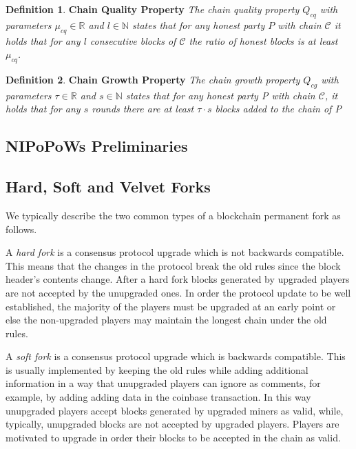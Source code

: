 \documentclass[10pt,a4paper]{article}
\theoremstyle{plain}
\theoremstyle{definition}
\newtheorem{defn}{Definition}
\theoremstyle{lemma}
\begin{document}
\begin{defn}{\textbf{Chain Quality Property}}
	\textit{The chain quality property $Q_{cq}$ with parameters $\mu_{cq} \in \mathbb{R}$ and $l \in \mathbb{N}$ states that for any honest party $P$ with chain $\mathcal{C}$ it holds that for any $l $ consecutive blocks of $\mathcal{C}$ the ratio of honest blocks is at least $\mu_{cq}$.}
	\label{defn:chain_quality}
\end{defn}

\begin{defn}{\textbf{Chain Growth Property}}
	\textit{The chain growth property $Q_{cg}$ with
parameters $\tau \in \mathbb{R}$ and $s \in \mathbb{N}$ states that for any honest party
\textit{P} with chain $\mathcal{C}$, it holds that for any $s$ rounds there are at least 
$\tau \cdot s$ blocks added to the chain of \textit{P}}
	\label{defn:chain_growth}
\end{defn}

\subsection{NIPoPoWs Preliminaries}

\subsection{Hard, Soft and Velvet Forks}
We typically describe the two common types of a blockchain permanent fork as follows.

A \textit{hard fork} is a consensus protocol upgrade which is not backwards
compatible. This means that the changes in the protocol break the old rules
since the block header's contents change. After a hard fork blocks generated
by upgraded players are not accepted by the unupgraded ones. In order the
protocol update to be well established, the majority of the players must be
upgraded at an early point or else the non-upgraded players may maintain the
longest chain under the old rules.

A \textit{soft fork} is a consensus protocol upgrade which is backwards compatible.
This is usually implemented by keeping the old rules while adding additional
information in a way that unupgraded players can ignore as comments, for example,
by adding adding data in the coinbase transaction. In this way unupgraded players
accept blocks generated by upgraded miners as valid, while, typically, unupgraded
blocks are not accepted by upgraded players. Players are motivated to upgrade in
order their blocks to be accepted in the chain as valid.
\end{document}
